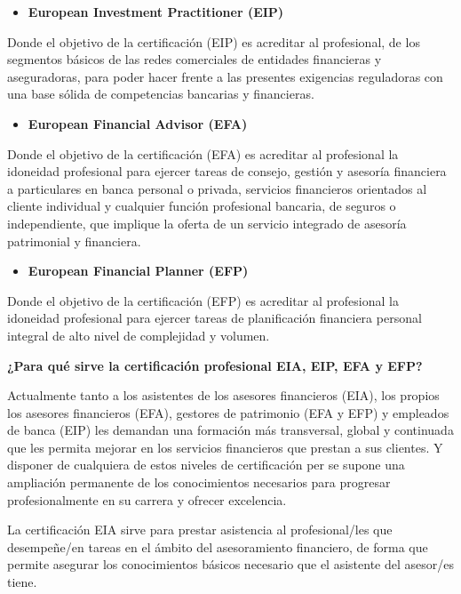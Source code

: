 \documentclass[
  letterpaper,
  DIV=11,
  numbers=noendperiod]{scrreprt}
\begin{document}
\begin{itemize}
\item
  \textbf{European Investment Practitioner (EIP)}
\end{itemize}

Donde el objetivo de la certificación (EIP) es acreditar al profesional,
de los segmentos básicos de las redes comerciales de entidades
financieras y aseguradoras, para poder hacer frente a las presentes
exigencias reguladoras con una base sólida de competencias bancarias y
financieras.

\begin{itemize}
\item
  \textbf{European Financial Advisor (EFA)}
\end{itemize}

Donde el objetivo de la certificación (EFA) es acreditar al profesional
la idoneidad profesional para ejercer tareas de consejo, gestión y
asesoría financiera a particulares en banca personal o privada,
servicios financieros orientados al cliente individual y cualquier
función profesional bancaria, de seguros o independiente, que implique
la oferta de un servicio integrado de asesoría patrimonial y financiera.

\begin{itemize}
\item
  \textbf{European Financial Planner (EFP)}
\end{itemize}

Donde el objetivo de la certificación (EFP) es acreditar al profesional
la idoneidad profesional para ejercer tareas de planificación financiera
personal integral de alto nivel de complejidad y volumen.

\textbf{¿Para qué sirve la certificación profesional EIA, EIP, EFA y
EFP?}

Actualmente tanto a los asistentes de los asesores financieros (EIA),
los propios los asesores financieros (EFA), gestores de patrimonio (EFA
y EFP) y empleados de banca (EIP) les demandan una formación más
transversal, global y continuada que les permita mejorar en los
servicios financieros que prestan a sus clientes. Y disponer de
cualquiera de estos niveles de certificación per se supone una
ampliación permanente de los conocimientos necesarios para progresar
profesionalmente en su carrera y ofrecer excelencia.

La certificación EIA sirve para prestar asistencia al profesional/les
que desempeñe/en tareas en el ámbito del asesoramiento financiero, de
forma que permite asegurar los conocimientos básicos necesario que el
asistente del asesor/es tiene.
\end{document}

